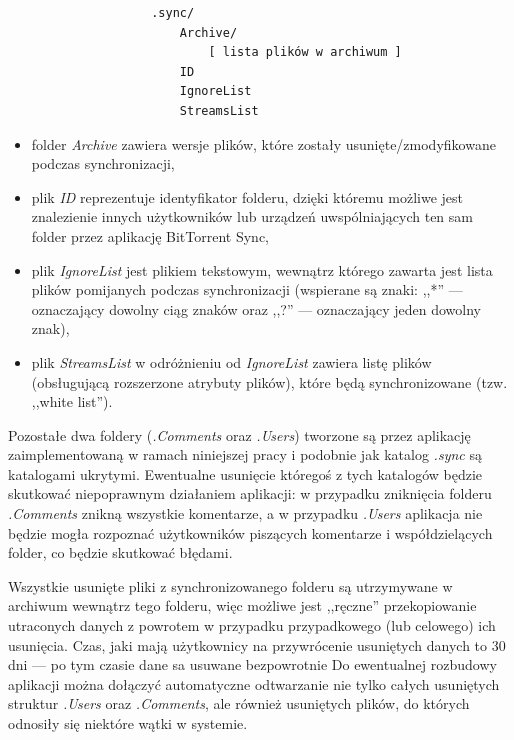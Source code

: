 \documentclass[polish,a4paper,twoside]{ppfcmthesis}
\begin{document}
\begin{verbatim}
                    .sync/
                        Archive/
                            [ lista plików w archiwum ]
                        ID
                        IgnoreList
                        StreamsList
\end{verbatim}

\begin{itemize}[noitemsep]
 \item folder \emph{Archive} zawiera wersje plików, które zostały usunięte/zmodyfikowane podczas synchronizacji,
 
 \item plik \emph{ID} reprezentuje identyfikator folderu, dzięki któremu możliwe jest znalezienie innych użytkowników lub urządzeń uwspólniających ten sam folder przez aplikację BitTorrent Sync,
 
 \item plik \emph{IgnoreList} jest plikiem tekstowym, wewnątrz którego zawarta jest lista plików pomijanych podczas synchronizacji (wspierane są znaki: ,,*'' --- oznaczający dowolny ciąg znaków  oraz ,,?'' --- oznaczający jeden dowolny znak),
 
 \item plik \emph{StreamsList} w odróżnieniu od \emph{IgnoreList} zawiera listę plików (obsługującą rozszerzone atrybuty plików), które będą synchronizowane (tzw. ,,white list'').
\end{itemize}


Pozostałe dwa foldery (\emph{.Comments} oraz \emph{.Users}) tworzone są przez aplikację zaimplementowaną w ramach niniejszej pracy i podobnie jak katalog \emph{.sync} są katalogami ukrytymi. Ewentualne usunięcie któregoś z tych katalogów będzie skutkować niepoprawnym działaniem aplikacji: w przypadku zniknięcia folderu \emph{.Comments} znikną wszystkie komentarze, a w przypadku \emph{.Users} aplikacja nie będzie mogła rozpoznać użytkowników piszących komentarze i współdzielących folder, co będzie skutkować błędami.

Wszystkie usunięte pliki z synchronizowanego folderu są utrzymywane w archiwum wewnątrz tego folderu, więc możliwe jest ,,ręczne'' przekopiowanie utraconych danych z powrotem w przypadku przypadkowego (lub celowego) ich usunięcia. Czas, jaki mają użytkownicy na przywrócenie usuniętych danych to 30 dni --- po tym czasie dane sa usuwane bezpowrotnie Do ewentualnej rozbudowy aplikacji można dołączyć automatyczne odtwarzanie nie tylko całych usuniętych struktur \emph{.Users} oraz \emph{.Comments}, ale również usuniętych plików, do których odnosiły się niektóre wątki w systemie.
\end{document}
